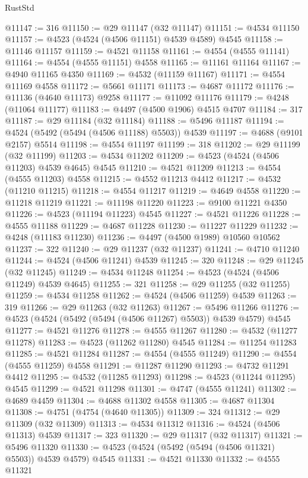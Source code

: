 \begin{lexlean}{RustStd}
\begin{coremodule}
@11147 := 316
@11150 := @29 @11147 (@32 @11147)
@11151 := @4534 @11150
@11157 := @4523 (@4524 (@4506 @11151) @4539 @4589) @4545
@11158 := @11146 @11157
@11159 := @4521 @11158
@11161 := @4554 (@4555 @11141)
@11164 := @4554 (@4555 @11151) @4558
@11165 := @11161 @11164
@11167 := @4940 @11165 @4350
@11169 := @4532 (@11159 @11167)
@11171 := @4554 @11169 @4558
@11172 := @5661 @11171
@11173 := @4687 @11172
@11176 := @11136 (@4640 @11173) @9258
@11177 := @11092 @11176
@11179 := @4248 (@11064 @11177)
@11183 := @4497 (@4500 @1906) @4515 @4707
@11184 := 317
@11187 := @29 @11184 (@32 @11184)
@11188 := @5496 @11187
@11194 := @4524 (@5492 (@5494 (@4506 @11188) @5503)) @4539
@11197 := @4688 (@9101 @2157) @5514
@11198 := @4554 @11197
@11199 := 318
@11202 := @29 @11199 (@32 @11199)
@11203 := @4534 @11202
@11209 := @4523 (@4524 (@4506 @11203) @4539 @4645) @4545
@11210 := @4521 @11209
@11213 := @4554 (@4555 @11203) @4558
@11215 := @4552 @11213 @4412
@11217 := @4532 (@11210 @11215)
@11218 := @4554 @11217
@11219 := @4649 @4558
@11220 := @11218 @11219
@11221 := @11198 @11220
@11223 := @9100 @11221 @4350
@11226 := @4523 (@11194 @11223) @4545
@11227 := @4521 @11226
@11228 := @4555 @11188
@11229 := @4687 @11228
@11230 := @11227 @11229
@11232 := @4248 (@11183 @11230)
@11236 := @4497 (@4500 @1989) @10560 @10562
@11237 := 322
@11240 := @29 @11237 (@32 @11237)
@11241 := @4710 @11240
@11244 := @4524 (@4506 @11241) @4539
@11245 := 320
@11248 := @29 @11245 (@32 @11245)
@11249 := @4534 @11248
@11254 := @4523 (@4524 (@4506 @11249) @4539 @4645)
@11255 := 321
@11258 := @29 @11255 (@32 @11255)
@11259 := @4534 @11258
@11262 := @4524 (@4506 @11259) @4539
@11263 := 319
@11266 := @29 @11263 (@32 @11263)
@11267 := @5496 @11266
@11276 := @4523 (@4524 (@5492 (@5494 (@4506 @11267) @5503)) @4539 @4579) @4545
@11277 := @4521 @11276
@11278 := @4555 @11267
@11280 := @4532 (@11277 @11278)
@11283 := @4523 (@11262 @11280) @4545
@11284 := @11254 @11283
@11285 := @4521 @11284
@11287 := @4554 (@4555 @11249)
@11290 := @4554 (@4555 @11259) @4558
@11291 := @11287 @11290
@11293 := @4732 @11291 @4412
@11295 := @4532 (@11285 @11293)
@11298 := @4523 (@11244 @11295) @4545
@11299 := @4521 @11298
@11301 := @4747 (@4555 @11241)
@11302 := @4689 @4459
@11304 := @4688 @11302 @4558
@11305 := @4687 @11304
@11308 := @4751 (@4754 (@4640 @11305))
@11309 := 324
@11312 := @29 @11309 (@32 @11309)
@11313 := @4534 @11312
@11316 := @4524 (@4506 @11313) @4539
@11317 := 323
@11320 := @29 @11317 (@32 @11317)
@11321 := @5496 @11320
@11330 := @4523 (@4524 (@5492 (@5494 (@4506 @11321) @5503)) @4539 @4579) @4545
@11331 := @4521 @11330
@11332 := @4555 @11321

\end{coremodule}
\end{lexlean}
